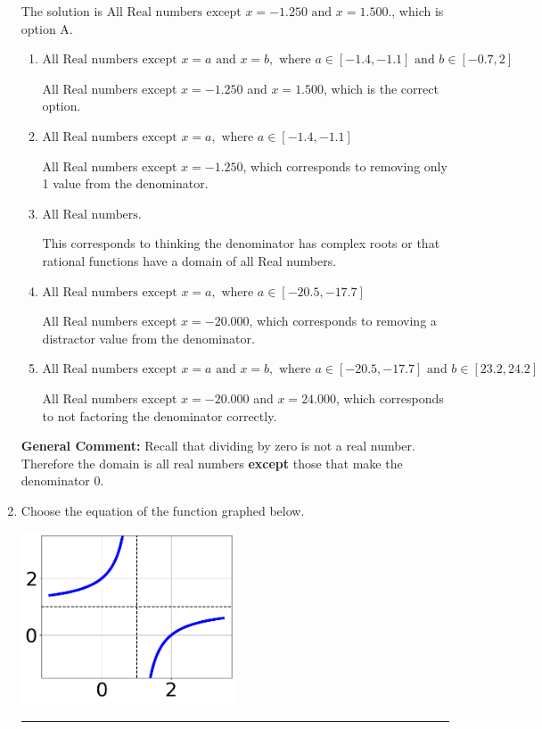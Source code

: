 \documentclass{extbook}[14pt]
\newcommand{\litem}[1]{\item #1

\rule{\textwidth}{0.4pt}}
\begin{document}
\begin{enumerate}
{The solution is \( \text{All Real numbers except } x = -1.250 \text{ and } x = 1.500. \), which is option A.\begin{enumerate}[label=\Alph*.]
\item \( \text{All Real numbers except } x = a \text{ and } x = b, \text{ where } a \in [-1.4, -1.1] \text{ and } b \in [-0.7, 2] \)

All Real numbers except $x = -1.250$ and $x = 1.500$, which is the correct option.
\item \( \text{All Real numbers except } x = a, \text{ where } a \in [-1.4, -1.1] \)

All Real numbers except $x = -1.250$, which corresponds to removing only 1 value from the denominator.
\item \( \text{All Real numbers.} \)

This corresponds to thinking the denominator has complex roots or that rational functions have a domain of all Real numbers.
\item \( \text{All Real numbers except } x = a, \text{ where } a \in [-20.5, -17.7] \)

All Real numbers except $x = -20.000$, which corresponds to removing a distractor value from the denominator.
\item \( \text{All Real numbers except } x = a \text{ and } x = b, \text{ where } a \in [-20.5, -17.7] \text{ and } b \in [23.2, 24.2] \)

All Real numbers except $x = -20.000$ and $x = 24.000$, which corresponds to not factoring the denominator correctly.
\end{enumerate}

\textbf{General Comment:} Recall that dividing by zero is not a real number. Therefore the domain is all real numbers \textbf{except} those that make the denominator 0.
}
\litem{
Choose the equation of the function graphed below.

\begin{center}
    \includegraphics[width=0.5\textwidth]{../Figures/rationalGraphToEquationA.png}
\end{center}




}
\end{enumerate}
\end{document}

